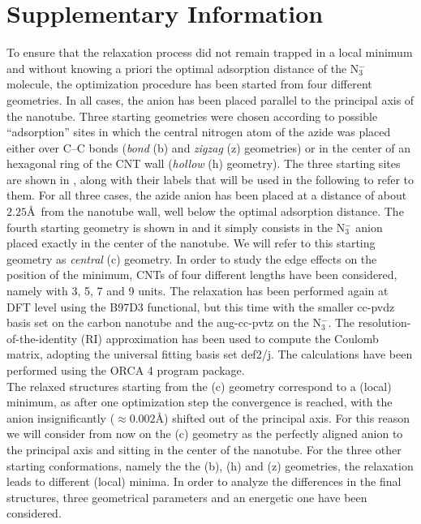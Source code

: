 \documentclass[utf8]{article}
\begin{document}
\section{Supplementary Information}
To ensure that the relaxation process did not remain trapped in a local minimum and without knowing a priori the optimal adsorption distance of the N$_3^-$ molecule, the optimization procedure has been started from four different geometries.
In all cases, the anion has been placed parallel to the principal axis of the nanotube.
Three starting geometries were chosen according to possible ``adsorption'' sites in which the central nitrogen atom of the azide was placed either over C--C bonds (\textit{bond} (b) and \textit{zigzag} (z) geometries) or in the center of an hexagonal ring of the CNT wall (\textit{hollow} (h) geometry). The three starting sites are shown in , along with their labels that will be used in the following to refer to them. For all three cases, the azide anion has been placed at a distance of about $2.25$\AA\ from the nanotube wall, well below the optimal adsorption distance.
The fourth starting geometry is shown in  and it simply consists in the N$_3^-$ anion placed exactly in the center of the nanotube. We will refer to this starting geometry as \textit{central} (c) geometry.
In order to study the edge effects on the position of the minimum, CNTs of four different lengths have been considered, namely with 3, 5, 7 and 9 units.
The relaxation has been performed again at DFT level using the B97D3 functional, but this time with the smaller cc-pvdz\cite{DunningJr1989} basis set on the carbon nanotube and the aug-cc-pvtz\cite{DunningJr1989} on the N$_3^-$.
The resolution-of-the-identity (RI) approximation has been used to compute the Coulomb matrix, adopting the universal fitting basis set def2/j\cite{Weigend2006}. The calculations have been performed using the ORCA 4 program package\cite{ORCA4}.\\
The relaxed structures starting from the (c) geometry correspond to a (local) minimum, as after one optimization step the convergence is reached, with the \ntm anion insignificantly ($\approx 0.002$\AA) shifted out of the principal axis. For this reason we will consider from now on the (c) geometry as the perfectly aligned anion to the principal axis and sitting in the center of the nanotube.
For the three other starting conformations, namely the the (b), (h) and (z) geometries, the relaxation leads to different (local) minima.
In order to analyze the differences in the final structures, three geometrical parameters and an energetic one have been considered.
\end{document}
